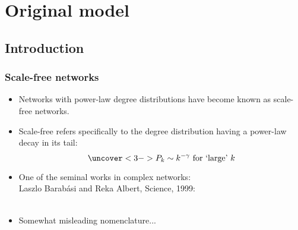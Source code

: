 
\section{Original model}

\subsection{Introduction}

\begin{frame}[label=]
 \frametitle{Scale-free networks}
 
 \begin{itemize}
 \item<1-> 
   Networks with power-law degree distributions
   have become known as \alert{scale-free} networks.
 \item<2->
   Scale-free refers specifically to the \alert{degree distribution}
   having a \alert{power-law decay} in its tail:
   $$
   \uncover<3->{
     P_k \sim k^{-\gamma} 
     \mbox{\ for `large' $k$}
   }
   $$
 \item<4->
   One of the seminal works in complex networks:\\
   Laszlo Barab\'{a}si and Reka Albert, Science, 1999:\\
   \cite{barabasi1999a}\\
 \item<5->
   Somewhat misleading nomenclature...
 \end{itemize}

\end{frame}

